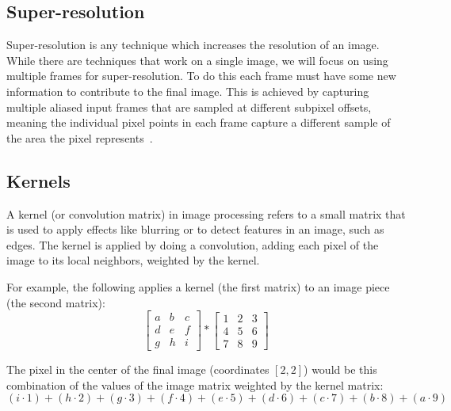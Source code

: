 \documentclass{sig-alternate}
\begin{document}


\subsection{Super-resolution}
\label{sec:background:superResolution}

Super-resolution is any technique which increases the resolution of an image. While there are techniques that work on a single image, we will focus on using multiple frames for super-resolution. To do this each frame must have some new information to contribute to the final image.
This is achieved by capturing multiple aliased input frames that are sampled at different subpixel offsets, meaning the individual pixel points in each frame capture a different sample of the area the pixel represents~\cite{Wronski2019}. 


\subsection{Kernels}
\label{sec:background:kernels}

A kernel (or convolution matrix) in image processing refers to a small matrix that is used to apply effects like blurring or to detect features in an image, such as edges. The kernel is applied by doing a convolution, adding each pixel of the image to its local neighbors, weighted by the kernel. \cite{wiki:kernel}

For example, the following applies a kernel (the first matrix) to an image piece (the second matrix):
\begin{equation*}
\begin{bmatrix}
a & b & c \\
d & e & f \\
g & h & i
\end{bmatrix}
*
\begin{bmatrix}
1 & 2 & 3 \\
4 & 5 & 6 \\
7 & 8 & 9
\end{bmatrix}
\end{equation*}

The pixel in the center of the final image (coordinates $[2,2]$) would be this combination of the values of the image matrix weighted by the kernel matrix:
\begin{equation*}
(i \cdot 1)+(h \cdot 2)+(g \cdot 3)+(f \cdot 4)+(e \cdot 5)+(d \cdot 6)+(c \cdot 7)+(b \cdot 8)+(a \cdot 9)
\end{equation*}
\end{document}
